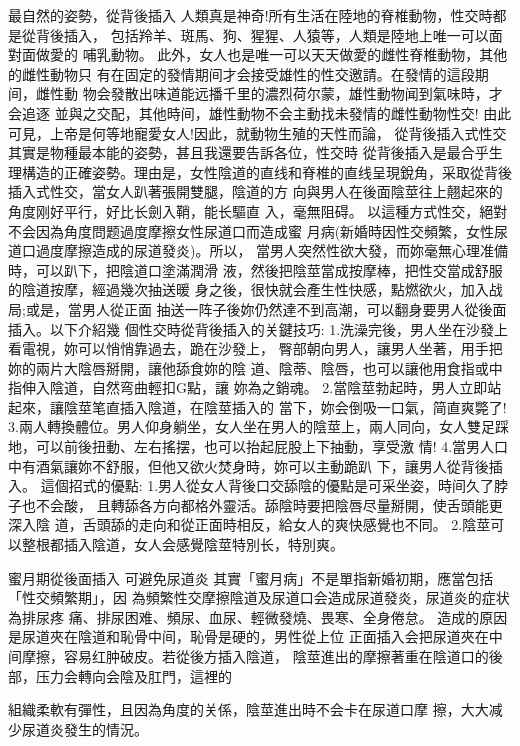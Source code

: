 \documentclass[12pt,UTF8]{ctexbook}
\begin{document}
最自然的姿勢，從背後插入
人類真是神奇!所有生活在陸地的脊椎動物，性交時都是從背後插入，
包括羚羊、斑馬、狗、猩猩、人猿等，人類是陸地上唯一可以面對面做愛的
哺乳動物。
此外，女人也是唯一可以天天做愛的雌性脊椎動物，其他的雌性動物只
有在固定的發情期间才会接受雄性的性交邀請。在發情的這段期间，雌性動
物会發散出味道能远播千里的濃烈荷尔蒙，雄性動物闻到氣味時，才会追逐
並與之交配，其他時间，雄性動物不会主動找未發情的雌性動物性交!
由此可見，上帝是何等地寵愛女人!因此，就動物生殖的天性而論，
從背後插入式性交其實是物種最本能的姿勢，甚且我還要告訴各位，性交時
從背後插入是最合乎生理構造的正確姿勢。理由是，女性陰道的直线和脊椎的直线呈現銳角，采取從背後插入式性交，當女人趴著張開雙腿，陰道的方
向與男人在後面陰莖往上翹起來的角度刚好平行，好比长劍入鞘，能长驅直
入，毫無阻碍。
以這種方式性交，絕對不会因為角度問题過度摩擦女性尿道口而造成蜜
月病(新婚時因性交頻繁，女性尿道口過度摩擦造成的尿道發炎)。所以，
當男人突然性欲大發，而妳毫無心理准備時，可以趴下，把陰道口塗滿潤滑
液，然後把陰莖當成按摩棒，把性交當成舒服的陰道按摩，經過幾次抽送暖
身之後，很快就会產生性快感，點燃欲火，加入战局;或是，當男人從正面
抽送一阵子後妳仍然達不到高潮，可以翻身要男人從後面插入。以下介紹幾
個性交時從背後插入的关鍵技巧:
1.洗澡完後，男人坐在沙發上看電視，妳可以悄悄靠過去，跪在沙發上，
臀部朝向男人，讓男人坐著，用手把妳的兩片大陰唇掰開，讓他舔食妳的陰
道、陰蒂、陰唇，也可以讓他用食指或中指伸入陰道，自然弯曲輕扣G點，讓
妳為之銷魂。
2.當陰莖勃起時，男人立即站起來，讓陰莖笔直插入陰道，在陰莖插入的
當下，妳会倒吸一口氣，简直爽斃了!
3.兩人轉換體位。男人仰身躺坐，女人坐在男人的陰莖上，兩人同向，女人雙足踩地，可以前後扭動、左右搖摆，也可以抬起屁股上下抽動，享受激
情!
4.當男人口中有酒氣讓妳不舒服，但他又欲火焚身時，妳可以主動跪趴
下，讓男人從背後插入。
這個招式的優點:
1.男人從女人背後口交舔陰的優點是可采坐姿，時间久了脖子也不会酸，
且轉舔各方向都格外靈活。舔陰時要把陰唇尽量掰開，使舌頭能更深入陰
道，舌頭舔的走向和從正面時相反，給女人的爽快感覺也不同。
2.陰莖可以整根都插入陰道，女人会感覺陰莖特別长，特別爽。

蜜月期從後面插入
可避免尿道炎
其實「蜜月病」不是單指新婚初期，應當包括「性交頻繁期」，因
為頻繁性交摩擦陰道及尿道口会造成尿道發炎，尿道炎的症状為排尿疼
痛、排尿困难、頻尿、血尿、輕微發燒、畏寒、全身倦怠。
造成的原因是尿道夾在陰道和恥骨中间，恥骨是硬的，男性從上位
正面插入会把尿道夾在中间摩擦，容易红肿破皮。若從後方插入陰道，
陰莖進出的摩擦著重在陰道口的後部，压力会轉向会陰及肛門，這裡的

組織柔軟有彈性，且因為角度的关係，陰莖進出時不会卡在尿道口摩
擦，大大减少尿道炎發生的情況。
\end{document}
